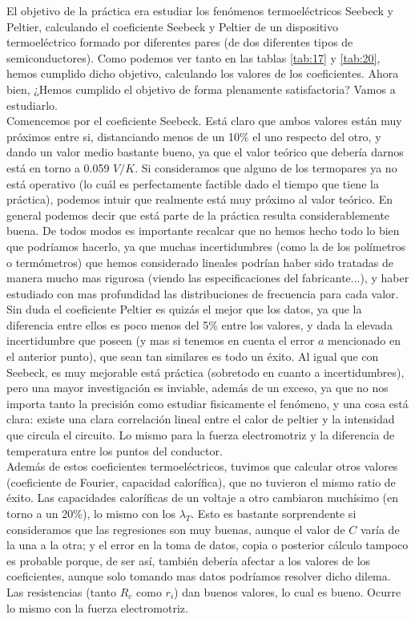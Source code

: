 \documentclass[12pt,a4paper]{article}
\begin{document}
El objetivo de la práctica era estudiar los fenómenos termoeléctricos Seebeck y Peltier, calculando el coeficiente Seebeck y Peltier de un dispositivo termoeléctrico formado por diferentes pares (de dos diferentes tipos de semiconductores). Como podemos ver tanto en las tablas \ref{tab:17} y \ref{tab:20}, hemos cumplido dicho objetivo, calculando los valores de los coeficientes. Ahora bien, ¿Hemos cumplido el objetivo de forma plenamente satisfactoria? Vamos a estudiarlo. \\

Comencemos por el coeficiente Seebeck. Está claro que ambos valores están muy próximos entre si, distanciando menos de un 10\% el uno respecto del otro, y dando un valor medio bastante bueno, ya que el valor teórico que debería darnos está en torno a 0.059 $V/K$. Si consideramos que alguno de los termopares ya no está operativo (lo cuál es perfectamente factible dado el tiempo que tiene la práctica), podemos intuir que realmente está muy próximo al valor teórico. En general podemos decir que está parte de la práctica resulta considerablemente buena. De todos modos es importante recalcar que no hemos hecho todo lo bien que podríamos hacerlo, ya que muchas incertidumbres (como la de los polímetros o termómetros) que hemos considerado lineales podrían haber sido tratadas de manera mucho mas rigurosa (viendo las especificaciones del fabricante...), y haber estudiado con mas profundidad las distribuciones de frecuencia para cada valor. \\

Sin duda el coeficiente Peltier es quizás el mejor que los datos, ya que la diferencia entre ellos es poco menos del 5\% entre los valores, y dada la elevada incertidumbre que poseen (y mas si tenemos en cuenta el error $a$ mencionado en el anterior punto), que sean tan similares es todo un éxito. Al igual que con Seebeck, es muy mejorable está práctica (sobretodo en cuanto a incertidumbres), pero una mayor investigación es inviable, además de un exceso, ya que no nos importa tanto la precisión como estudiar fisicamente el fenómeno, y una cosa está clara: existe una clara correlación lineal entre el calor de peltier  y la intensidad que circula el circuito. Lo mismo para la fuerza electromotriz y la diferencia de temperatura entre los puntos del conductor. \\

Además de estos coeficientes termoeléctricos, tuvimos que calcular otros valores (coeficiente de Fourier, capacidad calorífica), que no tuvieron el mismo ratio de éxito. Las capacidades caloríficas de un voltaje a otro cambiaron muchísimo (en torno a un 20\%), lo mismo con los $\lambda_T$. Esto es bastante sorprendente si consideramos que las regresiones son muy buenas, aunque el valor de $C$ varía de la una a la otra; y el error en la toma de datos, copia o posterior cálculo tampoco es probable porque, de ser así, también debería afectar a los valores de los coeficientes, aunque solo tomando mas datos podríamos resolver dicho dilema. Las resistencias (tanto $R_c$ como $r_i$) dan buenos valores, lo cual es bueno. Ocurre lo mismo con la fuerza electromotriz. \\
\end{document}
